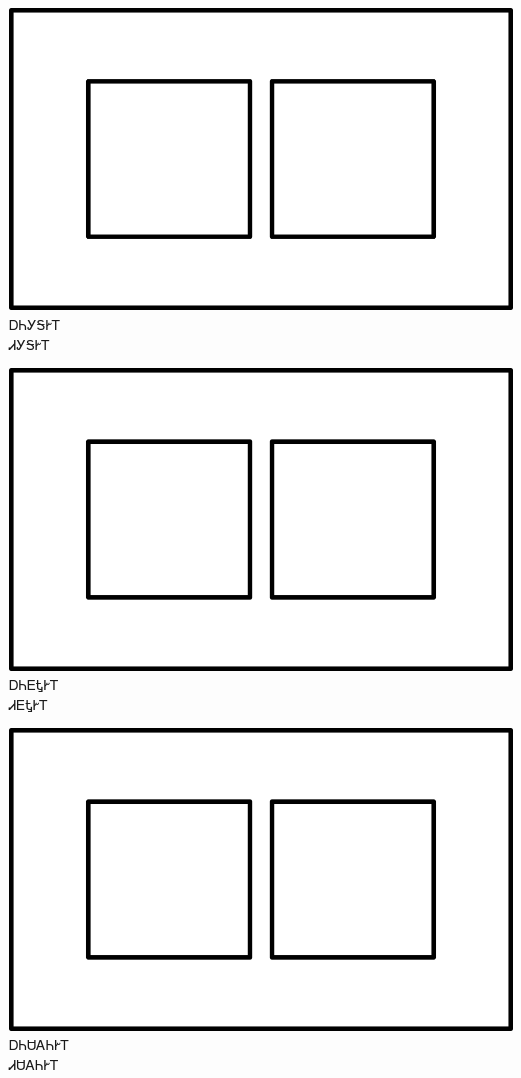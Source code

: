 \documentclass[avery5371]{flashcards}%
\begin{document}
\begin{flashcard}{
\includegraphics[width=0.95\columnwidth,height=.51\columnwidth,keepaspectratio]{../artwork/for-colors/squares-white}
}\Huge ᎠᏂᎩᎦᎨᎢ\\ᏗᎩᎦᎨᎢ
\end{flashcard}

\begin{flashcard}{
\includegraphics[width=0.95\columnwidth,height=.51\columnwidth,keepaspectratio]{../artwork/for-colors/squares-white}
}\Huge ᎠᏂᎬᎿᎨᎢ\\ᏗᎬᎿᎨᎢ
\end{flashcard}

\begin{flashcard}{
\includegraphics[width=0.95\columnwidth,height=.51\columnwidth,keepaspectratio]{../artwork/for-colors/squares-white}
}\Huge ᎠᏂᏌᎪᏂᎨᎢ\\ᏗᏌᎪᏂᎨᎢ
\end{flashcard}
\end{document}
